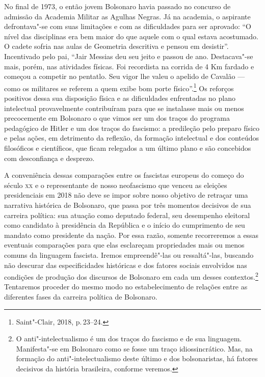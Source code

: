 No final de 1973, o então jovem Bolsonaro havia passado no concurso de
admissão da Academia Militar as Agulhas Negras. Já na academia, o
aspirante defrontava"-se com suas limitações e com as dificuldades para
ser aprovado: ``O nível das disciplinas era bem maior do que aquele com
o qual estava acostumado. O cadete sofria nas aulas de Geometria
descritiva e pensou em desistir''. Incentivado pelo pai, ``Jair Messias
deu seu jeito e passou de ano. Destacava"-se mais, porém, nas atividades
físicas. Foi recordista na corrida de 4 Km fardado e começou a competir
no pentatlo. Seu vigor lhe valeu o apelido de Cavalão --- como os
militares se referem a quem exibe bom porte físico''.\footnote{Saint"-Clair,
  2018, p.\,23--24.} Os reforços positivos dessa sua disposição física e
as dificuldades enfrentadas no plano intelectual provavelmente
contribuíram para que se instalasse mais ou menos precocemente em
Bolsonaro o que vimos ser um dos traços do programa pedagógico de Hitler
e um dos traços do fascismo: a predileção pelo preparo físico e pelas
ações, em detrimento da reflexão, da formação intelectual e dos
conteúdos filosóficos e científicos, que ficam relegados a um último
plano e são concebidos com desconfiança e desprezo.

A conveniência dessas comparações entre os fascistas europeus do começo
do século \textsc{xx} e o representante de nosso neofascismo que venceu as
eleições presidenciais em 2018 não deve se impor sobre nosso objetivo de
retraçar uma narrativa histórica de Bolsonaro, que passa por três
momentos decisivos de sua carreira política: sua atuação como deputado
federal, seu desempenho eleitoral como candidato à presidência da
República e o início do cumprimento de seu mandato como presidente da
nação. Por essa razão, somente recorreremos a essas eventuais
comparações para que elas esclareçam propriedades mais ou menos comuns
da linguagem fascista. Iremos empreendê"-las ou ressaltá"-las, buscando
não descurar das especificidades históricas e dos fatores sociais
envolvidos nas condições de produção dos discursos de Bolsonaro em cada
um desses contextos.\footnote{O anti"-intelectualismo é um dos traços do
  fascismo e de sua linguagem. Manifesta"-se em Bolsonaro como se fosse
  um traço idiossincrático. Mas, na formação do anti"-intelectualismo
  deste último e dos bolsonaristas, há fatores decisivos da história
  brasileira, conforme veremos.} Tentaremos proceder do mesmo modo no
estabelecimento de relações entre as diferentes fases da carreira
política de Bolsonaro.

